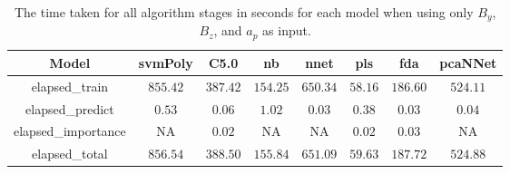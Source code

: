 \begin{table}[!ht]
	\centering
	\begin{tabular}{|c|c|c|c|c|c|c|c|}
		\hline
		Model & svmPoly & C5.0 & nb & nnet & pls & fda & pcaNNet \\ \hline
		elapsed_train & $855.42$ & $387.42$ & $154.25$ & $650.34$ & $58.16$ & $186.60$ & $524.11$ \\ \hline
		elapsed_predict & $0.53$ & $0.06$ & $1.02$ & $0.03$ & $0.38$ & $0.03$ & $0.04$ \\ \hline
		elapsed_importance & NA & $0.02$ & NA & NA & $0.02$ & $0.03$ & NA \\ \hline
		elapsed_total & $856.54$ & $388.50$ & $155.84$ & $651.09$ & $59.63$ & $187.72$ & $524.88$ \\ \hline
	\end{tabular}
	\caption{The time taken for all algorithm stages in seconds for each model when using only $B_{y}$, $B_{z}$, and $a_{p}$ as input.}
	\label{tab:time:reverse:yzap}
\end{table}
